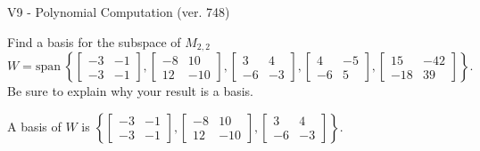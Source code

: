 \begin{exercise}
  \begin{exerciseTitle}V9 - Polynomial Computation (ver. 748)\end{exerciseTitle}
  \begin{exerciseStatement}
    Find a basis for the subspace of \(M_{2,2}\) 
\[W=\mathrm{span}\ \left\{\left[\begin{array}{cc}
-3 & -1 \\
-3 & -1
\end{array}\right] , \left[\begin{array}{cc}
-8 & 10 \\
12 & -10
\end{array}\right] , \left[\begin{array}{cc}
3 & 4 \\
-6 & -3
\end{array}\right] , \left[\begin{array}{cc}
4 & -5 \\
-6 & 5
\end{array}\right] , \left[\begin{array}{cc}
15 & -42 \\
-18 & 39
\end{array}\right]\right\}.\]
 Be sure to explain why your result is a basis.


  \end{exerciseStatement}
  \begin{exerciseAnswer}
   A basis of \(W\) is  \(\left\{\left[\begin{array}{cc}
-3 & -1 \\
-3 & -1
\end{array}\right] , \left[\begin{array}{cc}
-8 & 10 \\
12 & -10
\end{array}\right] , \left[\begin{array}{cc}
3 & 4 \\
-6 & -3
\end{array}\right]\right\}\).
  


  \end{exerciseAnswer}
\end{exercise}